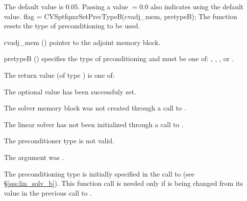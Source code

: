{
  The default value is $0.05$.
  Passing a value $ = 0.0$ also indicates using the default value.
}
{
  flag = CVSptfqmrSetPrecTypeB(cvadj\_mem, pretypeB);
}
{
  The function  resets the type
  of preconditioning to be used.
}
{
  \begin{args}
  \item[cvadj\_mem] ()
    pointer to the adjoint memory block.
  \item[pretypeB] ()
    specifies the type of prconditioning and must be one of:
    , , , or .
  \end{args}
}
{
  The return value  (of type ) is one of:
  \begin{args}
  \item[\Id{CVSPGMR\_SUCCESS}] 
    The optional value has been successfuly set.
  \item[\Id{CVSPGMR\_MEM\_NULL}]
    The {\cvodes} solver memory block was not created through a call to .
  \item[\Id{CVSPGMR\_LMEM\_NULL}]
    The {\cvsptfqmr} linear solver has not been initialized through a call to .
  \item[\Id{CVSPGMR\_ILL\_INPUT}]
    The preconditioner type  is not valid.
  \item[\Id{CVSPGMR\_ADJMEM\_NULL}]
    The  argument was .
  \end{args}
}
{
  The preconditioning type is initially specified in the call
  to  (see \S\ref{sss:lin_solv_b}). This function call is
  needed only if  is being changed from its value in the
  previous call to .
}


